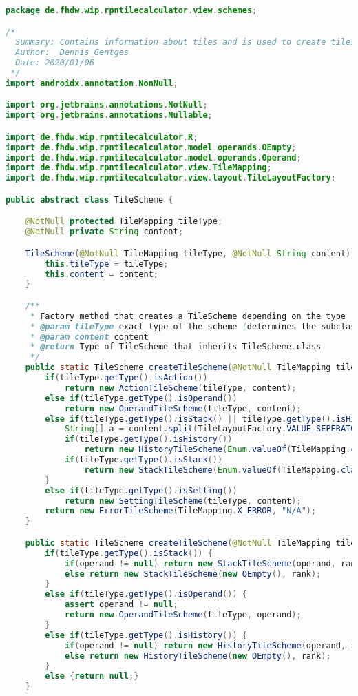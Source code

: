 \begin{lstlisting}[caption=TileScheme,label=list:TileScheme,language=Java]
package de.fhdw.wip.rpntilecalculator.view.schemes;

/*
  Summary: Contains information about tiles and is used to create tiles and save them
  Author:  Dennis Gentges
  Date: 2020/01/06
 */
import androidx.annotation.NonNull;

import org.jetbrains.annotations.NotNull;
import org.jetbrains.annotations.Nullable;

import de.fhdw.wip.rpntilecalculator.R;
import de.fhdw.wip.rpntilecalculator.model.operands.OEmpty;
import de.fhdw.wip.rpntilecalculator.model.operands.Operand;
import de.fhdw.wip.rpntilecalculator.view.TileMapping;
import de.fhdw.wip.rpntilecalculator.view.layout.TileLayoutFactory;

public abstract class TileScheme {

    @NotNull protected TileMapping tileType;
    @NotNull private String content;

    TileScheme(@NotNull TileMapping tileType, @NotNull String content) {
        this.tileType = tileType;
        this.content = content;
    }

    /**
     * Factory method that creates a TileScheme depending on the type
     * @param tileType exact type of the scheme (determines the subclass)
     * @param content content
     * @return Type of TileScheme that inherits TileScheme.class
     */
    public static TileScheme createTileScheme(@NotNull TileMapping tileType, @Nullable String content) {
        if(tileType.getType().isAction())
            return new ActionTileScheme(tileType, content);
        else if(tileType.getType().isOperand())
            return new OperandTileScheme(tileType, content);
        else if(tileType.getType().isStack() || tileType.getType().isHistory()) {
            String[] a = content.split(TileLayoutFactory.VALUE_SEPERATOR);
            if(tileType.getType().isHistory())
                return new HistoryTileScheme(Enum.valueOf(TileMapping.class, a[1]), a[2], Integer.parseInt(a[0]));
            if(tileType.getType().isStack())
                return new StackTileScheme(Enum.valueOf(TileMapping.class, a[1]), a[2], Integer.parseInt(a[0]));
        }
        else if(tileType.getType().isSetting())
            return new SettingTileScheme(tileType, content);
        return new ErrorTileScheme(TileMapping.X_ERROR, "N/A");
    }

    public static TileScheme createTileScheme(@NotNull TileMapping tileType, @Nullable Operand operand, int rank) {
        if(tileType.getType().isStack()) {
            if(operand != null) return new StackTileScheme(operand, rank);
            else return new StackTileScheme(new OEmpty(), rank);
        }
        else if(tileType.getType().isOperand()) {
            assert operand != null;
            return new OperandTileScheme(tileType, operand);
        }
        else if(tileType.getType().isHistory()) {
            if(operand != null) return new HistoryTileScheme(operand, rank);
            else return new HistoryTileScheme(new OEmpty(), rank);
        }
        else {return null;}
    }


\end{lstlisting}
